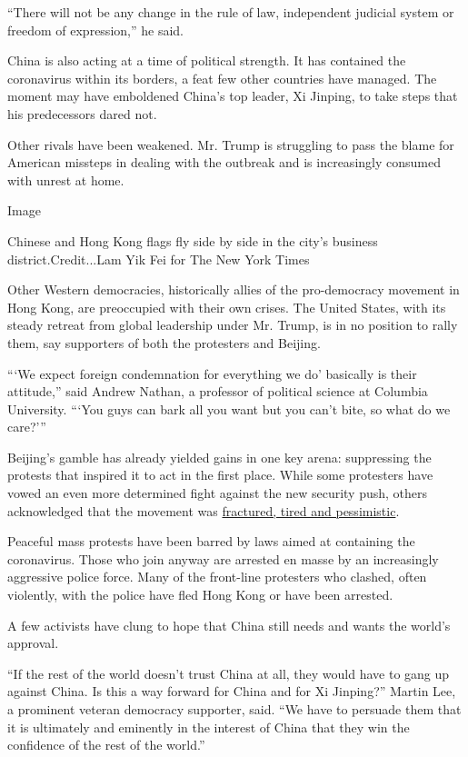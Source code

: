 ``There will not be any change in the rule of law, independent judicial
system or freedom of expression,'' he said.

China is also acting at a time of political strength. It has contained
the coronavirus within its borders, a feat few other countries have
managed. The moment may have emboldened China's top leader, Xi Jinping,
to take steps that his predecessors dared not.

Other rivals have been weakened. Mr. Trump is struggling to pass the
blame for American missteps in dealing with the outbreak and is
increasingly consumed with unrest at home.

Image

Chinese and Hong Kong flags fly side by side in the city's business
district.Credit...Lam Yik Fei for The New York Times

Other Western democracies, historically allies of the pro-democracy
movement in Hong Kong, are preoccupied with their own crises. The United
States, with its steady retreat from global leadership under Mr. Trump,
is in no position to rally them, say supporters of both the protesters
and Beijing.

```We expect foreign condemnation for everything we do' basically is
their attitude,'' said Andrew Nathan, a professor of political science
at Columbia University. ```You guys can bark all you want but you can't
bite, so what do we care?'''

Beijing's gamble has already yielded gains in one key arena: suppressing
the protests that inspired it to act in the first place. While some
protesters have vowed an even more determined fight against the new
security push, others acknowledged that the movement was
\href{https://t.co/hyDqjNF9Dl?amp=1}{fractured, tired and pessimistic}.

Peaceful mass protests have been barred by laws aimed at containing the
coronavirus. Those who join anyway are arrested en masse by an
increasingly aggressive police force. Many of the front-line protesters
who clashed, often violently, with the police have fled Hong Kong or
have been arrested.

A few activists have clung to hope that China still needs and wants the
world's approval.

``If the rest of the world doesn't trust China at all, they would have
to gang up against China. Is this a way forward for China and for Xi
Jinping?'' Martin Lee, a prominent veteran democracy supporter, said.
``We have to persuade them that it is ultimately and eminently in the
interest of China that they win the confidence of the rest of the
world.''

